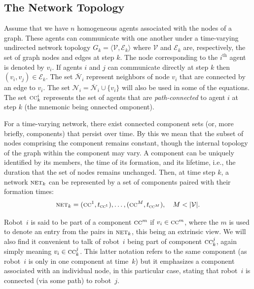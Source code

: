 \documentclass[journal]{IEEEtran}
\newcommand{\net}{\ensuremath{\textsc{net}}}
\theoremstyle{remark}
\theoremstyle{definition}
\begin{document}
\subsection{The Network Topology} 

Assume that we have $n$ homogeneous agents associated with the nodes of a 
graph. These agents can communicate with one another under a time-varying 
undirected network topology $ G_{k} = \langle \mathcal{V},\mathcal{E}_k\rangle 
$ where $\mathcal{V}$ and $\mathcal{E}_k$ are, respectively, the set of graph nodes and edges 
at step $k$. The node corresponding to the $i^\text{th}$ agent is 
denoted by $v_i$. 
If agents $i$ and 
$j$ can communicate directly at step $k$ then
$(v_i,v_j)\in \mathcal{E}_k$. 
The set $\overline{\mathcal{N}}_i$ 
represent 
neighbors of node ${v}_i$ that are connected by an edge to $v_i$. The set 
$\mathcal{N}_i=\overline{\mathcal{N}}_i\cup \{v_i\}$ will also be used in some 
of the equations. The set $\textsc{cc}_k^i$ represents the set of agents 
that are \textit{path-connected} to agent $i$ at step $k$ (the mnemonic being \underline{}onnected \underline{}omponent).

For a time-varying network, there exist connected component sets (or, more briefly, components) that persist over time. 
By this we mean that the subset of nodes comprising the component remains constant, though the internal topology of the graph within the component may vary. 
A component can be uniquely identified by its members, the time of its formation, and its lifetime, i.e., the duration that the set of nodes remains unchanged. Then, at time step $k$, a network $\net_k$ can be represented by a set of components paired with their formation times:
\begin{equation}
	\net_k = {(\textsc{cc}^1,t_{\textsc{cc}^1}), \dots, (\textsc{cc}^M,t_{\textsc{cc}^M})},\quad M<|\mathcal{V}|.
\end{equation}

Robot~$i$ is said to be part of a component $\textsc{cc}^m$  if $v_i\in \textsc{cc}^m$, where the $m$ is used to denote 
an entry from the pairs in $\net_k$, this being an extrinsic view.
We will also find it  convenient to talk of robot~$i$ being
part of component $\textsc{cc}_k^j$, again simply meaning $v_i\in \textsc{cc}_k^j$. 
This latter notation refers to the same component (as robot~$i$ is only in one component at time~$k$) but it emphasizes a component associated with an individual node, in this particular case, stating that robot~$i$ is connected (via some path) to robot~$j$.
\end{document}
